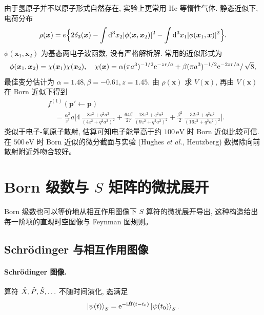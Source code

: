 由于氢原子并不以原子形式自然存在, 实验上更常用 He 等惰性气体. 静态近似下, 电荷分布
\begin{equation}
\rho(\bm x)=e\Bigl\{2\delta_{3}(\bm x)-\int\mathrm{d}^{3}x_{2}|\phi(\bm x,\bm x_{2})|^{2}-\int\mathrm{d}^{3}x_{1}|\phi(\bm x_{1},\bm x)|^{2}\Bigr\}.
\end{equation}
$\phi(\bm x_{1},\bm x_{2})$ 为基态两电子波函数, 没有严格解析解. 常用的近似形式为
\begin{equation}
\phi(\bm x_{1},\bm x_{2})=\chi(\bm x_{1})\chi(\bm x_{2}),\quad
\chi(\bm x)=\alpha(\pi a^{3})^{-1/2}\mathrm{e}^{-zr/a}+\beta(\pi a^{3})^{-1/2}\mathrm{e}^{-2zr/a}/\,\sqrt{8},
\end{equation}
最佳变分估计为 $\alpha=1.48,\beta=-0.61,z=1.45$. 由 $\rho(\bm x)$ 求 $V(\bm x)$, 再由 $V(\bm x)$ 在 Born 近似下得到
\begin{equation}
\begin{aligned}
&f^{(1)}(\bm p'\!\leftarrow\bm p)\\
&\quad=\frac{\alpha^{2}}{z^{3}}a\Biggl[
4\,\frac{8z^{2}+q^{2}a^{2}}{(4z^{2}+q^{2}a^{2})^{2}}
+\frac{64\beta}{27}\,\frac{18z^{2}+q^{2}a^{2}}{(9z^{2}+q^{2}a^{2})^{2}}
+\frac{\beta^{2}}{2}\,\frac{32z^{2}+q^{2}a^{2}}{(16z^{2}+q^{2}a^{2})^{2}}
\Biggr].
\end{aligned}
\end{equation}
类似于电子-氢原子散射, 估算可知电子能量高于约 $100\,\mathrm{eV}$ 时 Born 近似比较可信. 在 $500\,\mathrm{eV}$ 时 Born 近似的微分截面与实验 (Hughes \emph{et al.}, Heutzberg) 数据除向前散射附近外吻合较好。

\section{Born 级数与 $S$ 矩阵的微扰展开}\label{sec:S-perturbation}

Born 级数也可以等价地从相互作用图像下 $S$ 算符的微扰展开导出, 这种构造给出每一阶项的直观时空图像与 Feynman 图规则。

\subsection{Schrödinger 与相互作用图像}

\paragraph{Schrödinger 图像.}
算符 $\hat{X},\hat{P},\hat{S},\ldots$ 不随时间演化, 态满足
\begin{equation}
\ket{\psi(t)}_{S}=\mathrm{e}^{-\mathrm{i}\hat{H}(t-t_{0})}\ket{\psi(t_{0})}_{S}.
\end{equation}

